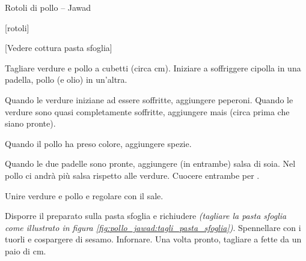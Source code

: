 \begin{recipe}{Rotoli di pollo -- Jawad}
    \begin{header}
        [rotoli]

        [Vedere cottura pasta sfoglia]
    \end{header}
    
    \begin{ingredients}[15]


        
    \end{ingredients}
    
    \begin{preparation}
        \step Tagliare verdure e pollo a cubetti (circa  cm).
        \step Iniziare a soffriggere cipolla in una padella, pollo (e olio) in un'altra.
        
        \step Quando le verdure iniziane ad essere soffritte, aggiungere peperoni.
        \step Quando le verdure sono quasi completamente soffritte, aggiungere mais (circa  prima che siano pronte).

        \step Quando il pollo ha preso colore, aggiungere spezie.

        \step Quando le due padelle sono pronte, aggiungere (in entrambe) salsa di soia. Nel pollo ci andrà più salsa rispetto alle verdure.
        \step Cuocere entrambe per .
        
        \step Unire verdure e pollo e regolare con il sale.

        \step*
        \step*
        
        \step Disporre il preparato sulla pasta sfoglia e richiudere
            \textit{(tagliare la pasta sfoglia come illustrato in figura \ref{fig:pollo_jawad:tagli_pasta_sfoglia})}.
        \step Spennellare con i tuorli e cospargere di sesamo.
        \step Infornare.
        \step Una volta pronto, tagliare a fette da un paio di cm.
    \end{preparation}


\end{recipe}
